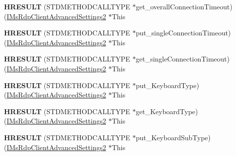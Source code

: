 \begin{DoxyCompactItemize}
{\bfseries H\+R\+E\+S\+U\+LT} (S\+T\+D\+M\+E\+T\+H\+O\+D\+C\+A\+L\+L\+T\+Y\+PE $\ast$get\+\_\+overall\+Connection\+Timeout)(\hyperlink{interface_m_s_t_s_c_lib_1_1_i_ms_rdp_client_advanced_settings2}{I\+Ms\+Rdp\+Client\+Advanced\+Settings2} $\ast$This
\item 
\mbox{\label{struct_m_s_t_s_c_lib_1_1_i_ms_rdp_client_advanced_settings2_vtbl_a8741b605b6ca8f4adc8df07ac92a4e22}} 
{\bfseries H\+R\+E\+S\+U\+LT} (S\+T\+D\+M\+E\+T\+H\+O\+D\+C\+A\+L\+L\+T\+Y\+PE $\ast$put\+\_\+single\+Connection\+Timeout)(\hyperlink{interface_m_s_t_s_c_lib_1_1_i_ms_rdp_client_advanced_settings2}{I\+Ms\+Rdp\+Client\+Advanced\+Settings2} $\ast$This
\item 
\mbox{\label{struct_m_s_t_s_c_lib_1_1_i_ms_rdp_client_advanced_settings2_vtbl_adc08b04cf8c142b4a03ef5e328088463}} 
{\bfseries H\+R\+E\+S\+U\+LT} (S\+T\+D\+M\+E\+T\+H\+O\+D\+C\+A\+L\+L\+T\+Y\+PE $\ast$get\+\_\+single\+Connection\+Timeout)(\hyperlink{interface_m_s_t_s_c_lib_1_1_i_ms_rdp_client_advanced_settings2}{I\+Ms\+Rdp\+Client\+Advanced\+Settings2} $\ast$This
\item 
\mbox{\label{struct_m_s_t_s_c_lib_1_1_i_ms_rdp_client_advanced_settings2_vtbl_a64e86e6719a57dcc10f1491e6c643047}} 
{\bfseries H\+R\+E\+S\+U\+LT} (S\+T\+D\+M\+E\+T\+H\+O\+D\+C\+A\+L\+L\+T\+Y\+PE $\ast$put\+\_\+\+Keyboard\+Type)(\hyperlink{interface_m_s_t_s_c_lib_1_1_i_ms_rdp_client_advanced_settings2}{I\+Ms\+Rdp\+Client\+Advanced\+Settings2} $\ast$This
\item 
\mbox{\label{struct_m_s_t_s_c_lib_1_1_i_ms_rdp_client_advanced_settings2_vtbl_a652ae04751aaf6c67edfa882f22fa18d}} 
{\bfseries H\+R\+E\+S\+U\+LT} (S\+T\+D\+M\+E\+T\+H\+O\+D\+C\+A\+L\+L\+T\+Y\+PE $\ast$get\+\_\+\+Keyboard\+Type)(\hyperlink{interface_m_s_t_s_c_lib_1_1_i_ms_rdp_client_advanced_settings2}{I\+Ms\+Rdp\+Client\+Advanced\+Settings2} $\ast$This
\item 
\mbox{\label{struct_m_s_t_s_c_lib_1_1_i_ms_rdp_client_advanced_settings2_vtbl_a9bf57720b693bb4612e2c3efac26b4aa}} 
{\bfseries H\+R\+E\+S\+U\+LT} (S\+T\+D\+M\+E\+T\+H\+O\+D\+C\+A\+L\+L\+T\+Y\+PE $\ast$put\+\_\+\+Keyboard\+Sub\+Type)(\hyperlink{interface_m_s_t_s_c_lib_1_1_i_ms_rdp_client_advanced_settings2}{I\+Ms\+Rdp\+Client\+Advanced\+Settings2} $\ast$This

\end{DoxyCompactItemize}
